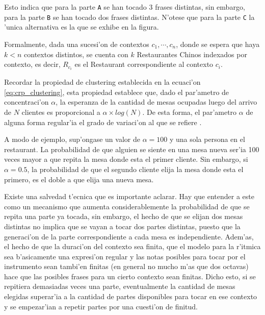 \begin{imagen}
    \width{10cm}
\end{imagen}


Esto indica que para la parte \texttt{A} se han tocado 3 frases distintas, sin embargo, para la parte \texttt{B} se han tocado dos frases distintas. 
N'otese que para la parte \texttt{C} la 'unica alternativa es la que se exhibe en la figura.

Formalmente, dada una sucesi'on de contextos $c_1, \cdots, c_n$, donde se espera que haya $k<n$ contextos distintos, se cuenta con $k$ Restaurantes Chinos indexados por contexto,
es decir, $R_{c_i}$ es el Restaurant correspondiente al contexto $c_i$. 

Recordar la propiedad de clustering establecida en la ecuaci'on \ref{eq:crp_clustering}, esta propiedad 
establece que, dado el par'ametro de concentraci'on $\alpha$, la esperanza de la cantidad de mesas ocupadas luego del arrivo de $N$ clientes es proporcional a $\alpha\times log(N)$.
De esta forma, el par'ametro $\alpha$ de alguna forma regular'ia el grado de variaci'on al que se refiere \cite{Deliege90}. 

A modo de ejemplo, sup'ongase un valor de $\alpha=100$ y una sola persona
en el restaurant. La probabilidad de que alguien se siente en una mesa nueva ser'ia 100 veces mayor a que repita la mesa donde esta el primer cliente. Sin embargo, si $\alpha=0.5$, 
la probabilidad de que el segundo cliente elija la mesa donde esta el primero, es el doble a que elija una nueva mesa.

Existe una salvedad t'ecnica que es importante aclarar. Hay que entender a este como un mecanismo que aumenta considerablemente la probabilidad de que se repita una parte ya tocada,
sin embargo, el hecho de que se elijan dos mesas distintas no implica que se vayan a tocar dos partes distintas, puesto que la generaci'on de la parte correspondiente
a cada mesa es independiente. Adem'as, el hecho de que la duraci'on del contexto sea finita, que el modelo para la r'itmica sea b'asicamente una expresi'on regular y 
las notas posibles para tocar por el instrumento sean tambi'en finitas (en general no mucho m'as que dos octavas) hace que las posibles frases para un cierto contexto
sean finitas. Dicho esto, si se repitiera demasiadas veces una parte, eventualmente la cantidad de mesas elegidas superar'ia a la cantidad de partes disponibles
para tocar en ese contexto y se empezar'ian a repetir partes por una cuesti'on de finitud. 

